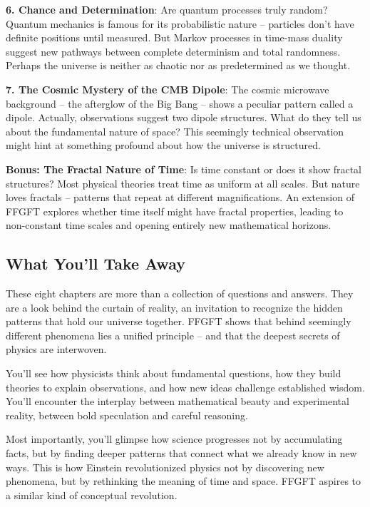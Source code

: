 \documentclass[11pt,oneside]{book}
\begin{document}
	\textbf{6. Chance and Determination}: Are quantum processes truly random? Quantum mechanics is famous for its probabilistic nature – particles don't have definite positions until measured. But Markov processes in time-mass duality suggest new pathways between complete determinism and total randomness. Perhaps the universe is neither as chaotic nor as predetermined as we thought.
	
	\textbf{7. The Cosmic Mystery of the CMB Dipole}: The cosmic microwave background – the afterglow of the Big Bang – shows a peculiar pattern called a dipole. Actually, observations suggest two dipole structures. What do they tell us about the fundamental nature of space? This seemingly technical observation might hint at something profound about how the universe is structured.
	
	\textbf{Bonus: The Fractal Nature of Time}: Is time constant or does it show fractal structures? Most physical theories treat time as uniform at all scales. But nature loves fractals – patterns that repeat at different magnifications. An extension of FFGFT explores whether time itself might have fractal properties, leading to non-constant time scales and opening entirely new mathematical horizons.
	
	\subsection*{What You'll Take Away}
	
	These eight chapters are more than a collection of questions and answers. They are a look behind the curtain of reality, an invitation to recognize the hidden patterns that hold our universe together. FFGFT shows that behind seemingly different phenomena lies a unified principle – and that the deepest secrets of physics are interwoven.
	
	You'll see how physicists think about fundamental questions, how they build theories to explain observations, and how new ideas challenge established wisdom. You'll encounter the interplay between mathematical beauty and experimental reality, between bold speculation and careful reasoning.
	
	Most importantly, you'll glimpse how science progresses not by accumulating facts, but by finding deeper patterns that connect what we already know in new ways. This is how Einstein revolutionized physics not by discovering new phenomena, but by rethinking the meaning of time and space. FFGFT aspires to a similar kind of conceptual revolution.
	
\end{document}
